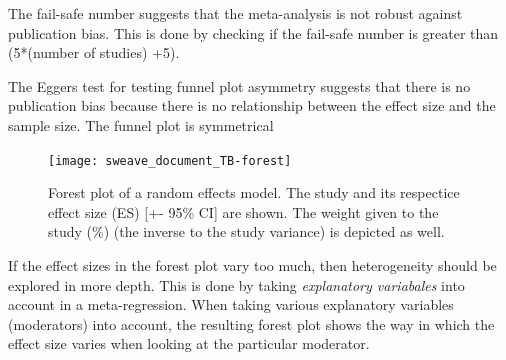 \documentclass[11pt, a4paper]{article}
\begin{document}

{The fail-safe number suggests that the meta-analysis is not robust against publication bias.} This is done by checking if the fail-safe number is greater than (5*(number of studies) +5). 



\noindent
The Eggers test for testing funnel plot asymmetry suggests that there is no publication bias because there is no relationship between the effect size and the sample size. The funnel plot is symmetrical





\begin{figure}[!h]
\captionsetup{width=0.6\textwidth}
\centering
\texttt{[image: sweave\_document\_TB-forest]}
\caption{Forest plot of a random effects model. The study and its respectice effect size (ES) [+- 95\% CI] are shown. The weight given to the study (\%) (the inverse to the study variance) is depicted as well.}
\label{fig:forestplot}
\end{figure}

If the effect sizes in the forest plot vary too  much, then heterogeneity should be explored in more depth. This is done by taking \emph{explanatory variabales} into account in a meta-regression. When taking various explanatory variables (moderators) into account, the resulting forest plot shows the way in which the effect size varies when looking at the particular moderator. 


\bigskip
\bigskip

\end{document}

